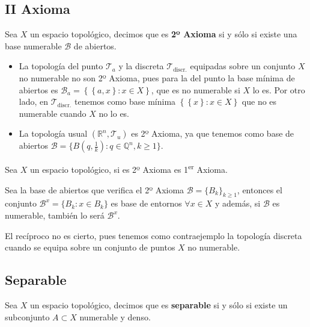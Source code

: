 \subsection{II Axioma}%
\label{sub:iiax}
\begin{defi}[2º Axioma]
Sea $X$ un espacio topológico, decimos que es \textbf{2º Axioma} si y sólo si existe una base numerable $\mathcal{B}$ de abiertos.
\end{defi}

\begin{ej}
\begin{itemize}
    \item La topología del punto $\mathcal{T}_a$ y la discreta $\mathcal{T}_{\text{discr.}}$ equipadas sobre un conjunto $X$ no numerable no son 2º Axioma, pues para la del punto la base mínima de abiertos es $\mathcal{B}_a = \left\{ \left\{ a, x \right\}: x \in X \right\}$, que es no numerable si $X$ lo es. Por otro lado, en $\mathcal{T}_{\text{discr.}}$ tenemos como base mínima $\left\{ \left\{ x \right\}: x \in X \right\}$ que no es numerable cuando $X$ no lo es.
    \item La topología usual $\left( \mathbb{R}^n, \mathcal{T}_{u} \right)$ es 2º Axioma, ya que tenemos como base de abiertos $\mathcal{B} = \{B \left( q, \frac{1}{k}\right) : q \in \mathbb{Q}^n, k \ge 1 \}$.
\end{itemize}
\end{ej}

\begin{prop}
Sea $X$ un espacio topológico, si es 2º Axioma es 1\textsuperscript{er} Axioma.
\end{prop}
\begin{demo}
Sea la base de abiertos que verifica el 2º Axioma $\mathcal{B} = \{B_k\}_{k \ge 1}$, entonces el conjunto $\mathcal{B}^x = \{B_k : x \in B_k\}$ es base de entornos $\forall x \in X$ y además, si $\mathcal{B}$ es numerable, también lo será $\mathcal{B}^x$.
\end{demo}

\begin{obs}
El recíproco no es cierto, pues tenemos como contraejemplo la topología discreta cuando se equipa sobre un conjunto de puntos $X$ no numerable.
\end{obs}

\subsection{Separable}%
\label{sub:separable}
\begin{defi}[Separable]
Sea $X$ un espacio topológico, decimos que es \textbf{separable} si y sólo si existe un subconjunto $A\subset X$ numerable y denso.
\end{defi}

